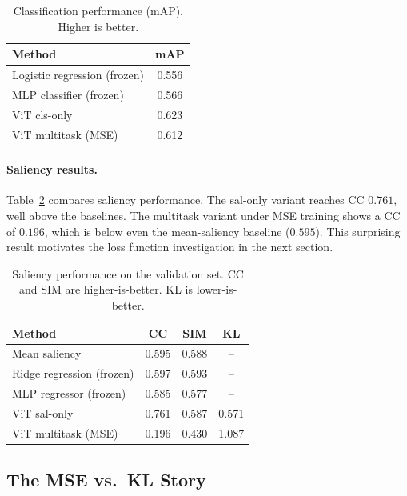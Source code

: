 \documentclass{article}
\begin{document}
\begin{table}[t]
\centering
\caption{Classification performance (mAP). Higher is better.}
\label{tab:cls}
\begin{tabular}{lc}
\toprule
Method & mAP \\
\midrule
Logistic regression (frozen) & 0.556 \\
MLP classifier (frozen) & 0.566 \\
\midrule
ViT cls-only & 0.623 \\
ViT multitask (MSE) & 0.612 \\
\bottomrule
\end{tabular}
\end{table}

\paragraph{Saliency results.}
Table~\ref{tab:sal} compares saliency performance. The sal-only variant reaches CC $0.761$, well above the baselines. The multitask variant under MSE training shows a CC of $0.196$, which is below even the mean-saliency baseline ($0.595$). This surprising result motivates the loss function investigation in the next section.

\begin{table}[t]
\centering
\caption{Saliency performance on the validation set. CC and SIM are higher-is-better. KL is lower-is-better.}
\label{tab:sal}
\begin{tabular}{lccc}
\toprule
Method & CC & SIM & KL \\
\midrule
Mean saliency & 0.595 & 0.588 & -- \\
Ridge regression (frozen) & 0.597 & 0.593 & -- \\
MLP regressor (frozen) & 0.585 & 0.577 & -- \\
\midrule
ViT sal-only & 0.761 & 0.587 & 0.571 \\
ViT multitask (MSE) & 0.196 & 0.430 & 1.087 \\
\bottomrule
\end{tabular}
\end{table}

\subsection{The MSE vs.\ KL Story}
\end{document}
